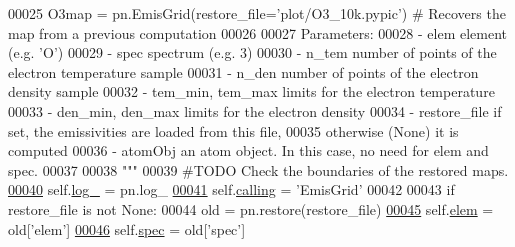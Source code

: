 \begin{DoxyCode}
00025 \textcolor{stringliteral}{            O3map = pn.EmisGrid(restore\_file='plot/O3\_10k.pypic') # Recovers the map from a previous
       computation}
00026 \textcolor{stringliteral}{}
00027 \textcolor{stringliteral}{        Parameters:}
00028 \textcolor{stringliteral}{            - elem               element (e.g. 'O')}
00029 \textcolor{stringliteral}{            - spec               spectrum (e.g. 3)}
00030 \textcolor{stringliteral}{            - n\_tem              number of points of the electron temperature sample}
00031 \textcolor{stringliteral}{            - n\_den              number of points of the electron density sample}
00032 \textcolor{stringliteral}{            - tem\_min, tem\_max   limits for the electron temperature}
00033 \textcolor{stringliteral}{            - den\_min, den\_max   limits for the electron density}
00034 \textcolor{stringliteral}{            - restore\_file       if set, the emissivities are loaded from this file, }
00035 \textcolor{stringliteral}{                                 otherwise (None) it is computed}
00036 \textcolor{stringliteral}{            - atomObj            an atom object. In this case, no need for elem and spec.}
00037 \textcolor{stringliteral}{}
00038 \textcolor{stringliteral}{        """}
00039         \textcolor{comment}{#TODO Check the boundaries of the restored maps.}
\hypertarget{emis_grid_8py_source_l00040}{}\hyperlink{classpyneb_1_1core_1_1emis_grid_1_1_emis_grid_a1a53003d1e4a12bbc4ff9233a3fcd54a}{00040}         self.\hyperlink{classpyneb_1_1core_1_1emis_grid_1_1_emis_grid_a1a53003d1e4a12bbc4ff9233a3fcd54a}{log\_} = pn.log\_
\hypertarget{emis_grid_8py_source_l00041}{}\hyperlink{classpyneb_1_1core_1_1emis_grid_1_1_emis_grid_a19820878261ee98513e0b755e688453f}{00041}         self.\hyperlink{classpyneb_1_1core_1_1emis_grid_1_1_emis_grid_a19820878261ee98513e0b755e688453f}{calling} = \textcolor{stringliteral}{'EmisGrid'}
00042 
00043         \textcolor{keywordflow}{if} restore\_file \textcolor{keywordflow}{is} \textcolor{keywordflow}{not} \textcolor{keywordtype}{None}:
00044             old = pn.restore(restore\_file)
\hypertarget{emis_grid_8py_source_l00045}{}\hyperlink{classpyneb_1_1core_1_1emis_grid_1_1_emis_grid_a860a236b0e426b4671071e4bf492dee7}{00045}             self.\hyperlink{classpyneb_1_1core_1_1emis_grid_1_1_emis_grid_a860a236b0e426b4671071e4bf492dee7}{elem} = old[\textcolor{stringliteral}{'elem'}]
\hypertarget{emis_grid_8py_source_l00046}{}\hyperlink{classpyneb_1_1core_1_1emis_grid_1_1_emis_grid_a78618aff86ea296ecefddcc86d98b687}{00046}             self.\hyperlink{classpyneb_1_1core_1_1emis_grid_1_1_emis_grid_a78618aff86ea296ecefddcc86d98b687}{spec} = old[\textcolor{stringliteral}{'spec'}]

\end{DoxyCode}
